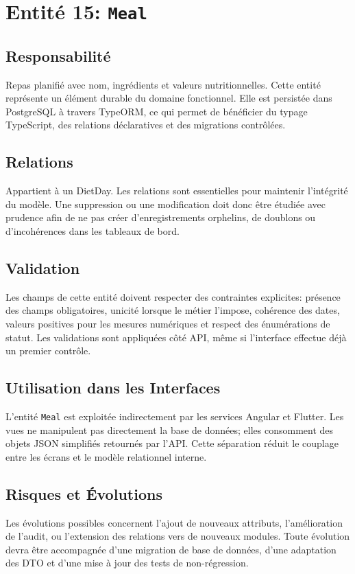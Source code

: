 \section{Entité 15: \texttt{Meal}}
\subsection{Responsabilité}
Repas planifié avec nom, ingrédients et valeurs nutritionnelles. Cette entité représente un élément durable du domaine fonctionnel. Elle est persistée dans PostgreSQL à travers TypeORM, ce qui permet de bénéficier du typage TypeScript, des relations déclaratives et des migrations contrôlées.

\subsection{Relations}
Appartient à un DietDay. Les relations sont essentielles pour maintenir l'intégrité du modèle. Une suppression ou une modification doit donc être étudiée avec prudence afin de ne pas créer d'enregistrements orphelins, de doublons ou d'incohérences dans les tableaux de bord.

\subsection{Validation}
Les champs de cette entité doivent respecter des contraintes explicites: présence des champs obligatoires, unicité lorsque le métier l'impose, cohérence des dates, valeurs positives pour les mesures numériques et respect des énumérations de statut. Les validations sont appliquées côté API, même si l'interface effectue déjà un premier contrôle.

\subsection{Utilisation dans les Interfaces}
L'entité \texttt{Meal} est exploitée indirectement par les services Angular et Flutter. Les vues ne manipulent pas directement la base de données; elles consomment des objets JSON simplifiés retournés par l'API. Cette séparation réduit le couplage entre les écrans et le modèle relationnel interne.

\subsection{Risques et Évolutions}
Les évolutions possibles concernent l'ajout de nouveaux attributs, l'amélioration de l'audit, ou l'extension des relations vers de nouveaux modules. Toute évolution devra être accompagnée d'une migration de base de données, d'une adaptation des DTO et d'une mise à jour des tests de non-régression.


